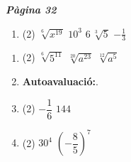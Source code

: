 \documentclass[a4paper, pdf, twoside]{book}
\begin{document}
\begin{multicols}{2}

{\textbf{\em Pàgina 32}} \hrulefill
\begin{enumerate}
\vspace{0.25cm}



 \item[\fontfamily{phv}\selectfont\color{blue}\textbf{46}. ] 
 \begin{tasks}[column-sep=1em, item-indent=1.3333em](2)
	 \task $\sqrt [6]{x^{19}}$
	 \task $10^3$
	 \task $6\,\sqrt [3]{5}$
	 \task $-\frac {1}{3}$
\end{tasks}
 \end{enumerate}
\begin{enumerate}
\vspace{0.25cm}



 \item[\fontfamily{phv}\selectfont\color{blue}\textbf{47}. ] 
 \begin{tasks}[column-sep=1em, item-indent=1.3333em](2)
	 \task $\sqrt [6]{5^{11}}$
	 \task $\sqrt [20]{a^{23}}$
	 \task $\sqrt [12]{a^{5}}$
\end{tasks}
\vspace{0.25cm}
 \item[$\bullet$ ] {\selectfont\color{blue}\textbf{Autoavaluació:}. }

\vspace{0.25cm}



 \item[\fontfamily{phv}\selectfont\color{blue}\textbf{1}. ]  \scalebox{0.6}{\simbolclau } 
 \begin{tasks}[column-sep=1em, item-indent=1.3333em](2)
	 \task $-\dfrac {1}{6}$
	 \task $144$
\end{tasks}
\vspace{0.25cm}



 \item[\fontfamily{phv}\selectfont\color{blue}\textbf{2}. ]  \scalebox{0.6}{\simbolclau } 
 \begin{tasks}[column-sep=1em, item-indent=1.3333em](2)
	 \task $30^4$
	 \task* $\left (-\dfrac {8}{5}\right )^7$
\end{tasks}
\vspace{0.25cm}



\end{enumerate}
\end{multicols}
\end{document}
